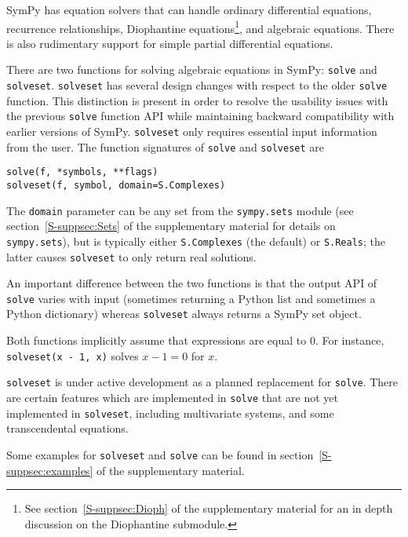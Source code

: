 SymPy has equation solvers that can handle ordinary differential equations,
recurrence relationships, Diophantine equations\footnote{See
  section~\ref{S-suppsec:Dioph} of the supplementary material for an in depth
  discussion on the Diophantine submodule.}, and algebraic equations. There is
also rudimentary support for simple partial differential equations.

There are two functions for solving algebraic equations in SymPy:
\texttt{solve} and \texttt{solveset}.
\texttt{solveset} has several design changes with respect to the older
\texttt{solve} function. This distinction is present in order to resolve the
usability issues with the
previous \texttt{solve} function API while maintaining backward compatibility
with earlier versions of SymPy.
\texttt{solveset} only requires essential input information from the user.
The function signatures of \texttt{solve} and \texttt{solveset} are
\begin{verbatim}
solve(f, *symbols, **flags)
solveset(f, symbol, domain=S.Complexes)
\end{verbatim}
The \texttt{domain} parameter can be any set from the \texttt{sympy.sets}
module (see section~\ref{S-suppsec:Sets} of the supplementary material for
details on \texttt{sympy.sets}), but is typically either \texttt{S.Complexes}
(the default) or \texttt{S.Reals}; the latter causes \texttt{solveset} to only
return real solutions.

An important difference between the two functions is that the output API of \texttt{solve}
varies with input (sometimes returning a Python list and sometimes a Python dictionary) whereas
\texttt{solveset} always returns
a SymPy set object.

Both functions implicitly assume that expressions are equal to 0. For
instance, \texttt{solveset(x - 1, x)} solves $x - 1 = 0$ for $x$.

\texttt{solveset} is under active development as a planned replacement for
\texttt{solve}. There are certain features which are implemented in
\texttt{solve} that are not yet implemented in \texttt{solveset}, including
multivariate systems, and some transcendental equations.

Some examples for \texttt{solveset} and \texttt{solve} can be found in
section~\ref{S-suppsec:examples} of the supplementary material.
